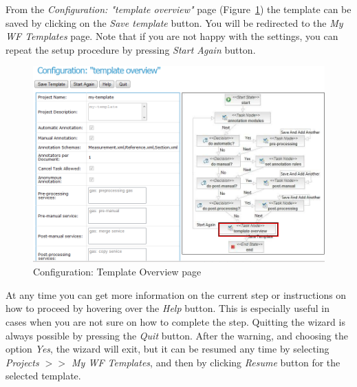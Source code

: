 From the \emph{Configuration: "template overview"} page
(Figure~\ref{fig:templateoverview}) the template can be saved by clicking on the
\emph{Save template} button. You will be redirected to the
 \emph{My WF Templates} page. Note that if you are not happy with the settings,
 you can repeat the setup procedure by pressing \emph{Start Again} button.
\begin{figure}
\centering
\includegraphics[scale=0.38]{templateoverview}
\caption{Configuration: Template Overview page}
\label{fig:templateoverview}
\end{figure}

At any time you can get more information on the current step or instructions
on how to proceed by hovering over the
 \emph{Help} button. This is especially useful in cases when you are not
sure on how to complete the step.
Quitting the wizard is always possible by pressing the \emph{Quit}
 button. After the warning, and choosing the option \emph{Yes}, the wizard will
 exit, but it can be resumed any time by selecting \emph{Projects $>>$ My WF
 Templates}, and then by clicking \emph{Resume} button for the selected
 template.

